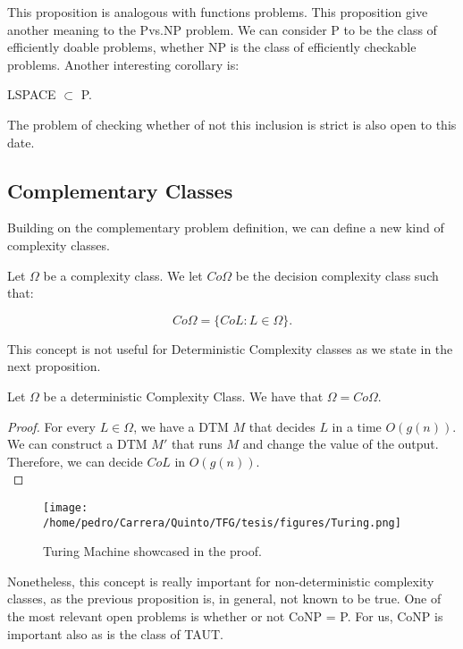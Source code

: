 This proposition is analogous with functions problems. This proposition give another meaning to the Pvs.NP problem. We can consider P to be the class of efficiently doable problems, whether NP is the class of efficiently checkable problems. Another interesting corollary is:\\

\begin{corollary}
  LSPACE $\subset$ P.
\end{corollary}

The problem of checking whether of not this inclusion is strict is also open to this date.


\subsection{Complementary Classes}

Building on the complementary problem definition, we can define a new kind of complexity classes.

\begin{definition}
  Let $\Omega$ be a complexity class. We let $Co\Omega$ be the decision complexity class such that:

  $$Co\Omega = \{CoL : L\in \Omega\}.$$
\end{definition}

This concept is not useful for Deterministic Complexity classes as we state in the next proposition.
\begin{proposition}
Let $\Omega$ be a deterministic Complexity Class. We have that $\Omega = Co\Omega$.
\end{proposition}
\begin{proof}
  For every $L\in \Omega$, we have a DTM $M$ that decides $L$ in a time $O(g(n))$. We can construct a DTM $M'$ that runs $M$ and change the value of the output. Therefore, we can decide $CoL$ in $O(g(n))$. \\
\end{proof}

\begin{figure}[h]
  \begin{center}
    \texttt{[image: /home/pedro/Carrera/Quinto/TFG/tesis/figures/Turing.png]}
  \end{center}
  \caption{Turing Machine showcased in the proof.}
\end{figure}


Nonetheless, this concept is really important for non-deterministic complexity classes, as the previous proposition is, in general, not known to be true. One of the most relevant open problems is whether or not CoNP = P. For us, CoNP is important also as is the class of TAUT.



